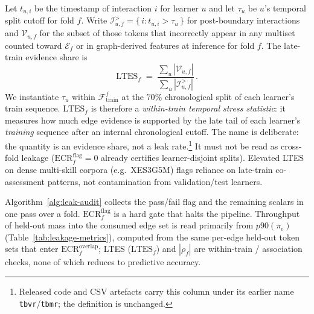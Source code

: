\documentclass[preprint,10pt,doubleblind]{elsarticle}
\begin{document}
Let $t_{u,i}$ be the timestamp of interaction $i$ for learner $u$ and
let $\tau_u$ be $u$'s temporal split cutoff for fold $f$. Write
$\mathcal{I}_{u,f}^{>}=\{\, i : t_{u,i}>\tau_u \,\}$ for post-boundary
interactions and $\mathcal{V}_{u,f}$ for the subset of those tokens that
incorrectly appear in any multiset counted toward $\mathcal{E}_f$ or in
graph-derived features at inference for fold $f$. The late-train evidence
share is
\begin{equation}
\mathrm{LTES}_f \;=\;
\frac{\sum_u |\mathcal{V}_{u,f}|}{\sum_u |\mathcal{I}_{u,f}^{>}|}\,.
\label{eq:ltes}
\end{equation}
We instantiate $\tau_u$ within $\mathcal{F}_{\text{train}}^f$ at the
$70\%$ chronological split of each learner's train sequence.
$\mathrm{LTES}_f$ is therefore a \emph{within-train temporal stress
statistic}: it measures how much edge evidence is supported by the late tail
of each learner's \emph{training} sequence after an internal chronological
cutoff. The name is deliberate: the quantity is an evidence share, not a leak
rate.\footnote{Released code and CSV artefacts carry this column under its
earlier name \texttt{tbvr}/\texttt{tbmr}; the definition is unchanged.}
It must not be read as cross-fold leakage
($\mathrm{ECR}^{\mathrm{flag}}_f{=}0$ already certifies learner-disjoint
splits). Elevated LTES on dense multi-skill corpora (e.g.\
XES3G5M) flags reliance on late-train co-assessment patterns, not contamination
from validation/test learners.

Algorithm~\ref{alg:leak-audit} collects the pass/fail flag and the remaining
scalars in one pass over a fold. $\mathrm{ECR}^{\mathrm{flag}}_f$
is a hard gate that halts the pipeline. Throughput of held-out mass into the
consumed edge set is read primarily from $p90(\pi_e)$
(Table~\ref{tab:leakage-metrics}), computed from the same per-edge held-out
token sets that enter $\mathrm{ECR}^{\mathrm{overlap}}_f$; LTES
($\mathrm{LTES}_f$) and $|\rho_f|$ are within-train / association checks,
none of which reduces to predictive accuracy.
\end{document}
